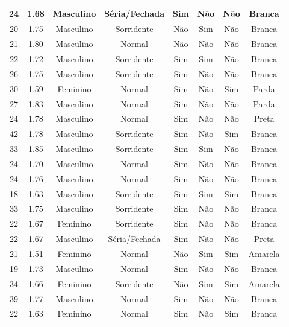 \begin{table}[!ht]
\begin{tabular}{c | c | c | c | c | c | c | c}
        \hline
        24 & 1.68 & Masculino & Séria/Fechada & Sim & Não & Não & Branca \\
        \hline
        20 & 1.75 & Masculino & Sorridente & Não & Sim & Não & Branca \\
        \hline
        21 & 1.80 & Masculino & Normal & Não & Não & Não & Branca \\
        \hline
        22 & 1.72 & Masculino & Sorridente & Sim & Sim & Não & Branca \\
        \hline
        26 & 1.75 & Masculino & Sorridente & Sim & Não & Não & Branca \\
        \hline
        30 & 1.59 & Feminino & Normal & Sim & Não & Sim & Parda \\
        \hline
        27 & 1.83 & Masculino & Normal & Sim & Não & Não & Parda \\
        \hline
        24 & 1.78 & Masculino & Normal & Sim & Não & Não & Preta \\
        \hline
        42 & 1.78 & Masculino & Sorridente & Sim & Não & Sim & Branca \\
        \hline
        33 & 1.85 & Masculino & Sorridente & Sim & Sim & Não & Branca \\
        \hline
        24 & 1.70 & Masculino & Normal & Sim & Não & Não & Branca \\
        \hline
        24 & 1.76 & Masculino & Normal & Sim & Não & Não & Branca \\
        \hline
        18 & 1.63 & Masculino & Sorridente & Sim & Sim & Sim & Branca \\
        \hline
        33 & 1.75 & Masculino & Sorridente & Sim & Não & Não & Branca \\
        \hline
        22 & 1.67 & Feminino & Sorridente & Sim & Não & Não & Branca \\
        \hline
        22 & 1.67 & Masculino & Séria/Fechada & Sim & Não & Não & Preta \\
        \hline
        21 & 1.51 & Feminino & Normal & Não & Sim & Sim & Amarela \\
        \hline
        19 & 1.73 & Masculino & Normal & Sim & Não & Não & Branca \\
        \hline
        34 & 1.66 & Feminino & Sorridente & Não & Sim & Sim & Amarela \\
        \hline
        39 & 1.77 & Masculino & Normal & Sim & Não & Não & Branca \\
        \hline
        22 & 1.63 & Feminino & Normal & Sim & Não & Sim & Branca \\

\end{tabular}
\end{table}
